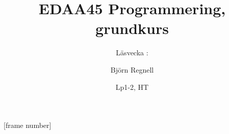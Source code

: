 [frame number]



\title[Föreläsningsanteckningar EDAA45, \CurrentYear]{EDAA45 Programmering, grundkurs}
\subtitle{Läsvecka \vecka: \veckotema}
\author{Björn Regnell}
\date{Lp1-2, HT \CurrentYear}


